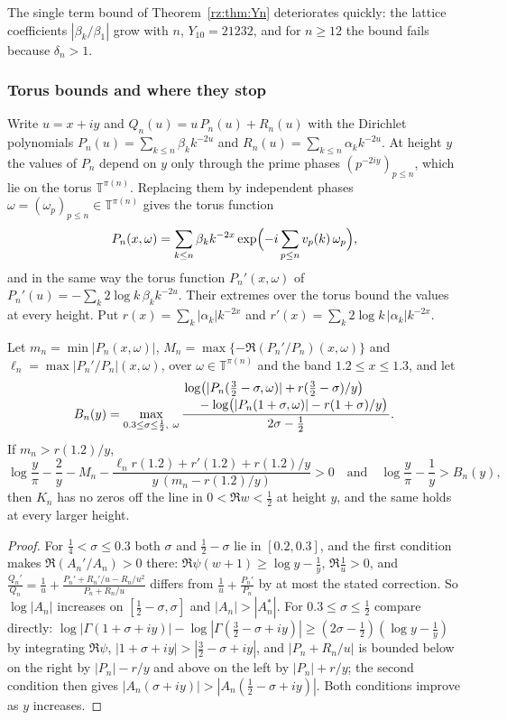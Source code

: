 The single term bound of Theorem~\ref{rz:thm:Yn} deteriorates quickly: the lattice coefficients $|\beta_k/\beta_1|$ grow with $n$, $Y_{10}=21232$, and for $n\ge12$ the bound fails because $\delta_n>1$.

\subsubsection{Torus bounds and where they stop}

Write $u=x+iy$ and $Q_n(u)=u\,P_n(u)+R_n(u)$ with the Dirichlet polynomials $P_n(u)=\sum_{k\le n}\beta_kk^{-2u}$ and $R_n(u)=\sum_{k\le n}\alpha_kk^{-2u}$. At height $y$ the values of $P_n$ depend on $y$ only through the prime phases $(p^{-2iy})_{p\le n}$, which lie on the torus $\mathbb T^{\pi(n)}$. Replacing them by independent phases $\omega=(\omega_p)_{p\le n}\in\mathbb T^{\pi(n)}$ gives the torus function
\[
P_n(x,\omega)=\sum_{k\le n}\beta_kk^{-2x}\exp\Bigl(-i\sum_{p\le n}v_p(k)\,\omega_p\Bigr),
\]
and in the same way the torus function $P_n'(x,\omega)$ of $P_n'(u)=-\sum_k2\log k\,\beta_kk^{-2u}$. Their extremes over the torus bound the values at every height. Put $r(x)=\sum_k|\alpha_k|k^{-2x}$ and $r'(x)=\sum_k2\log k\,|\alpha_k|k^{-2x}$.

\begin{theorem}\label{rz:thm:torus}
Let $m_n=\min|P_n(x,\omega)|$, $M_n=\max\{-\Re(P_n'/P_n)(x,\omega)\}$ and $\ell_n=\max|P_n'/P_n|(x,\omega)$, over $\omega\in\mathbb T^{\pi(n)}$ and the band $1.2\le x\le1.3$, and let
\[
B_n(y)=\max_{0.3\le\sigma\le\frac12,\ \omega}\frac{\splitfrac{\log\bigl(|P_n(\frac32-\sigma,\omega)|+r(\frac32-\sigma)/y\bigr)}{-\log\bigl(|P_n(1+\sigma,\omega)|-r(1+\sigma)/y\bigr)}}{2\sigma-\frac12}.
\]
If $m_n>r(1.2)/y$,
\[
\log\frac y\pi-\frac2y-M_n-\frac{\ell_nr(1.2)+r'(1.2)+r(1.2)/y}{y\,(m_n-r(1.2)/y)}>0\quad\text{and}\quad\log\frac y\pi-\frac1y>B_n(y),
\]
then $K_n$ has no zeros off the line in $0<\Re w<\frac12$ at height $y$, and the same holds at every larger height.
\end{theorem}

\begin{proof}
For $\frac14<\sigma\le0.3$ both $\sigma$ and $\frac12-\sigma$ lie in $[0.2,0.3]$, and the first condition makes $\Re(A_n'/A_n)>0$ there: $\Re\psi(w+1)\ge\log y-\frac1y$, $\Re\frac1u>0$, and $\frac{Q_n'}{Q_n}=\frac1u+\frac{P_n'+R_n'/u-R_n/u^2}{P_n+R_n/u}$ differs from $\frac1u+\frac{P_n'}{P_n}$ by at most the stated correction. So $\log|A_n|$ increases on $[\frac12-\sigma,\sigma]$ and $|A_n|>|A_n^*|$. For $0.3\le\sigma\le\frac12$ compare directly: $\log|\Gamma(1+\sigma+iy)|-\log|\Gamma(\frac32-\sigma+iy)|\ge(2\sigma-\frac12)(\log y-\frac1y)$ by integrating $\Re\psi$, $|1+\sigma+iy|>|\frac32-\sigma+iy|$, and $|P_n+R_n/u|$ is bounded below on the right by $|P_n|-r/y$ and above on the left by $|P_n|+r/y$; the second condition then gives $|A_n(\sigma+iy)|>|A_n(\frac12-\sigma+iy)|$. Both conditions improve as $y$ increases.
\end{proof}

